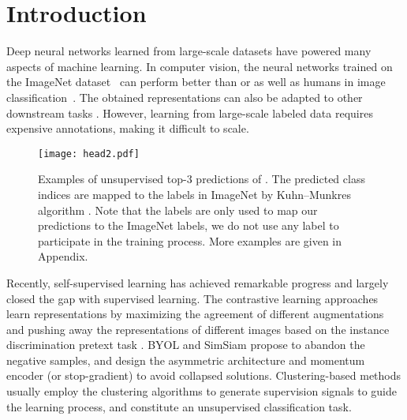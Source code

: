 \documentclass[10pt,twocolumn,letterpaper]{article}
\begin{document}
\section{Introduction}
\label{sec:intro}
Deep neural networks learned from large-scale datasets have powered many aspects of machine learning.
In computer vision, the neural networks trained on the ImageNet dataset~\cite{deng2009imagenet} can perform better than or as well as humans in image classification~\cite{krizhevsky2012imagenet,szegedy2015going,he2016deep,dosovitskiy2020image}. 
The obtained representations can also be adapted to other downstream tasks
\cite{ren2015faster,he2017mask,long2015fully}.
However, learning from large-scale labeled data requires expensive annotations, making it difficult to scale.
\begin{figure*}[t]
  \begin{center}
  \texttt{[image: head2.pdf]}
  \end{center}
  \vspace{-0.6cm}
  \caption{Examples of unsupervised top-3 predictions of \ourmethod. The predicted class indices are mapped to the labels in ImageNet by Kuhn–Munkres algorithm \cite{kuhn1955hungarian}. Note that the labels are only used to map our predictions to the ImageNet labels, we do not use any label to participate in the training process. More examples are given in Appendix.}
  \label{head}
  \vspace{-0.3cm}
\end{figure*}

Recently, self-supervised learning has achieved remarkable progress and largely closed the gap with supervised learning. The contrastive learning approaches ~\cite{wu2018unsupervised, he2020momentum, chen2020simple, chen2020improved, grill2020bootstrap, chen2021exploring} learn representations by maximizing the agreement of different augmentations and pushing away the representations of different images based on the instance discrimination pretext task \cite{wu2018unsupervised}. BYOL \cite{grill2020bootstrap} and SimSiam \cite{chen2021exploring} propose to abandon the negative samples, and design the asymmetric architecture and momentum encoder (or stop-gradient) to avoid collapsed solutions.
Clustering-based methods
\cite{caron2018deep, asano2019self, caron2020unsupervised} 
usually employ the clustering algorithms to generate supervision signals 
to guide the learning process, and constitute an unsupervised classification task. 
\end{document}
